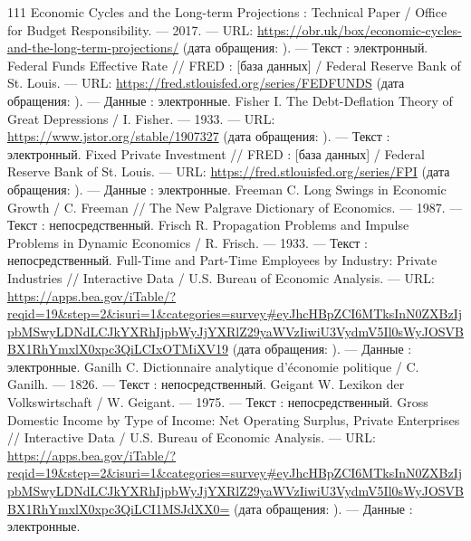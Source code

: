 \begin{RaggedRight}
\begin{thebibliography}{111}
     \hypertarget{bib:OBR-2017}{} Economic Cycles and the Long-term Projections : Technical Paper / Office for Budget Responsibility. --- 2017. --- URL: \url{https://obr.uk/box/economic-cycles-and-the-long-term-projections/} (дата обращения: \bibaccessdate). --- Текст : электронный.
     \hypertarget{bib:FRED-FEDFUNDS}{} Federal Funds Effective Rate // FRED : [база данных] / Federal Reserve Bank of St. Louis. --- URL: \url{https://fred.stlouisfed.org/series/FEDFUNDS} (дата обращения: \bibaccessdate). --- Данные : электронные.
     \hypertarget{bib:Fisher-1933}{} Fisher I. The Debt-Deflation Theory of Great Depressions / I. Fisher. --- 1933. --- URL: \url{https://www.jstor.org/stable/1907327} (дата обращения: \bibaccessdate). --- Текст : электронный.
     \hypertarget{bib:FRED-FPI}{} Fixed Private Investment // FRED : [база данных] / Federal Reserve Bank of St. Louis. --- URL: \url{https://fred.stlouisfed.org/series/FPI} (дата обращения: \bibaccessdate). --- Данные : электронные.
     \hypertarget{bib:Freeman-1987}{} Freeman C. Long Swings in Economic Growth / C. Freeman // The New Palgrave Dictionary of Economics. --- 1987. --- Текст : непосредственный.
     \hypertarget{bib:Frisch-1933}{} Frisch R. Propagation Problems and Impulse Problems in Dynamic Economics / R. Frisch. --- 1933. --- Текст : непосредственный.
     \hypertarget{bib:BEA-6.4}{} Full-Time and Part-Time Employees by Industry: Private Industries // Interactive Data / U.S. Bureau of Economic Analysis. --- URL: \url{https://apps.bea.gov/iTable/?reqid=19&step=2&isuri=1&categories=survey#eyJhcHBpZCI6MTksInN0ZXBzIjpbMSwyLDNdLCJkYXRhIjpbWyJjYXRlZ29yaWVzIiwiU3VydmV5Il0sWyJOSVBBX1RhYmxlX0xpc3QiLCIxOTMiXV19} (дата обращения: \bibaccessdate). --- Данные : электронные.
     \hypertarget{bib:Ganilh-1826}{} Ganilh C. Dictionnaire analytique d’économie politique / C. Ganilh. --- 1826. --- Текст : непосредственный.
     \hypertarget{bib:Geigant-1975}{} Geigant W. Lexikon der Volkswirtschaft / W. Geigant. --- 1975. --- Текст : непосредственный.
     \hypertarget{bib:BEA-1.10}{} Gross Domestic Income by Type of Income: Net Operating Surplus, Private Enterprises // Interactive Data / U.S. Bureau of Economic Analysis. --- URL: \url{https://apps.bea.gov/iTable/?reqid=19&step=2&isuri=1&categories=survey#eyJhcHBpZCI6MTksInN0ZXBzIjpbMSwyLDNdLCJkYXRhIjpbWyJjYXRlZ29yaWVzIiwiU3VydmV5Il0sWyJOSVBBX1RhYmxlX0xpc3QiLCI1MSJdXX0=} (дата обращения: \bibaccessdate). --- Данные : электронные.

\end{thebibliography}
\end{RaggedRight}
